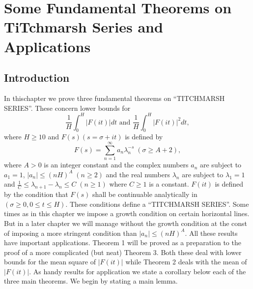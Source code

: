\chapter[Some Fundamental Theorems on TiTchmarsh Series and...]{Some
  Fundamental Theorems on TiTchmarsh Series and
  Applications}\label{c2} 

\section{Introduction}\label{c2:sec2.1}

In this\pageoriginale chapter we prove three fundamental theorems on
{\small ``TITCHMARSH SERIES''}. These concern lower bounds for  
$$
\frac{1}{H} \int^H_0 |F(it)| dt \text{ and } \frac{1}{H} \int^H_0 |F(it)|^2 dt, 
$$
where $H \geq 10$ and $F(s) (s = \sigma + it)$ is defined by
$$
F(s) = \sum\limits^\infty_{n=1} a_n \lambda^{-s}_n  \; (\sigma \geq A + 2), 
$$
where $A>0$ is an integer constant and the complex numbers $a_n$ are
subject to $a_1 = 1$, $|a_n| \leq (nH)^A \; (n \geq 2)$ and the real
numbers $\lambda_n$ are subject to $\lambda_1 =1$ and $\frac{1}{C}
\leq \lambda_{n+1} - \lambda_n \leq C \; (n \geq 1)$ where $C \geq 1$
is a constant. $F(it)$ is defined by the condition that $F(s)$ shall
be continuable analytically in $(\sigma \geq 0, 0 \leq t \leq
H)$. These conditions define a {\small ``TITCHMARSH SERIES''}. Some times as in
this chapter we impose a growth condition on certain horizontal
lines. But in a later chapter we will manage without the growth
condition at the const of imposing a more stringent condition than
$|a_n| \leq (nH)^A$. All these results have important
applications. Theorem 1 will be proved as a preparation to the proof
of a more complicated (but neat) Theorem 3. Both these deal with lower
bounds for the mean square of $|F(it)|$ while Theorem 2 deals with the
mean of $|F(it)|$. As handy results for application we state a
corollary below each of the three main theorems. We begin by stating a
main lemma. 

